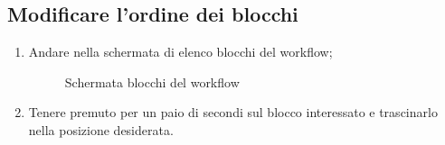 \subsection{Modificare l'ordine dei blocchi}
\begin{enumerate}
	\item Andare nella schermata di elenco blocchi del workflow;
	\begin{figure}[!ht]
		\centering
		\caption{Schermata blocchi del workflow}
	\end{figure}
	\item Tenere premuto per un paio di secondi sul blocco interessato e trascinarlo nella posizione desiderata.

\end{enumerate}

